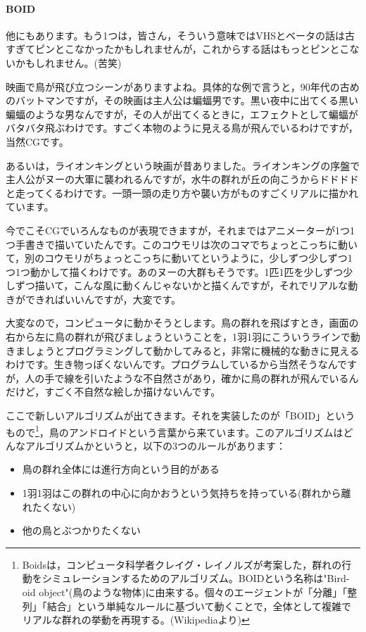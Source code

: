 \documentclass{ltjsbook}
\begin{document}
\paragraph{BOID}

他にもあります。もう1つは，皆さん，そういう意味ではVHSとベータの話は古すぎてピンとこなかったかもしれませんが，これからする話はもっとピンとこないかもしれません。(苦笑)

映画で鳥が飛び立つシーンがありますよね。具体的な例で言うと，90年代の古めのバットマンですが，その映画は主人公は蝙蝠男です。黒い夜中に出てくる黒い蝙蝠のような男なんですが，その人が出てくるときに，エフェクトとして蝙蝠がバタバタ飛ぶわけです。すごく本物のように見える鳥が飛んでいるわけですが，当然CGです。

あるいは，ライオンキングという映画が昔ありました。ライオンキングの序盤で主人公がヌーの大軍に襲われるんですが，水牛の群れが丘の向こうからドドドドと走ってくるわけです。一頭一頭の走り方や襲い方がものすごくリアルに描かれています。

今でこそCGでいろんなものが表現できますが，それまではアニメーターが1つ1つ手書きで描いていたんです。このコウモリは次のコマでちょっとこっちに動いて，別のコウモリがちょっとこっちに動いてというように，少しずつ少しずつ1つ1つ動かして描くわけです。あのヌーの大群もそうです。1匹1匹を少しずつ少しずつ描いて，こんな風に動くんじゃないかと描くんですが，それでリアルな動きができればいいんですが，大変です。

大変なので，コンピュータに動かそうとします。鳥の群れを飛ばすとき，画面の右から左に鳥の群れが飛びましょうということを，1羽1羽にこういうラインで動きましょうとプログラミングして動かしてみると，非常に機械的な動きに見えるわけです。生き物っぽくないんです。プログラムしているから当然そうなんですが，人の手で線を引いたような不自然さがあり，確かに鳥の群れが飛んでいるんだけど，すごく不自然な絵しか描けないんです。

ここで新しいアルゴリズムが出てきます。それを実装したのが「BOID」というもので\footnote{Boidsは，コンピュータ科学者クレイグ・レイノルズが考案した，群れの行動をシミュレーションするためのアルゴリズム。BOIDという名称は"Bird-oid object"(鳥のような物体)に由来する。個々のエージェントが「分離」「整列」「結合」という単純なルールに基づいて動くことで，全体として複雑でリアルな群れの挙動を再現する。(Wikipediaより)}，鳥のアンドロイドという言葉から来ています。このアルゴリズムはどんなアルゴリズムかというと，以下の3つのルールがあります：
\begin{itemize}
    \item 鳥の群れ全体には進行方向という目的がある
    \item 1羽1羽はこの群れの中心に向かおうという気持ちを持っている(群れから離れたくない)
    \item 他の鳥とぶつかりたくない
\end{itemize}
\end{document}

